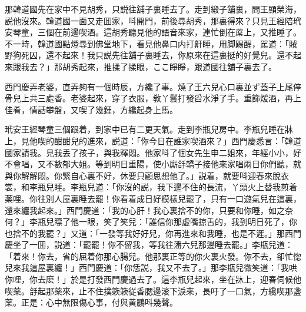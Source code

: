 那韓道國先在家中不見胡秀，只説往舖子裏睡去了。走到緞子舖裏，問王顯榮海，説他沒來。韓道國一面又走囬家，呌開門，前後尋胡秀，那裏得來？只見王經陪玳安琴童，三個在前邊喫酒。這胡秀聽見他的語音來家，連忙倒在蓆上，又推睡了。不一時，韓道國點燈尋到佛堂地下，看見他鼻口内打鼾睡，用脚踢醒，駡道：「賊野狗死囚，還不起來！我只説先往舖子裏睡去，你原來在這裏挺的好覺兒。還不起來跟我去？」那胡秀起來，推揉了揉眼，ここ睜睜，跟道國往舖子裏去了。

西門慶弄老婆，直弄夠有一個時辰，方纔了事。燒了王六兒心口裏並ず蓋子上尾停骨兒上共三處香。老婆起來，穿了衣服，敎丫鬟打發舀水淨了手。重篩煖酒，再上佳肴，情話攀盤，又喫了幾鍾，方纔起身上馬。

玳安王經琴童三個跟着，到家中已有二更天氣。走到李瓶兒房中。李瓶兒睡在牀上，見他喫的酣酣兒的進來，説道：「你今日在誰家喫酒來？」西門慶悉言：「韓道國家請我。見我丢了孩子，與我釋悶。他家呌了個女先生申二姐來，年經小小，好不會唱，又不數郁大姐。等到明日重陽，使小廝㧱轎子接他來家唱兩日你們聽，就與你解解悶。你緊自心裏不好，休要只顧思想他了。」説着，就要呌迎春來脫衣裳，和李瓶兒睡。李瓶兒道：「你沒的説，我下邊不住的長流，丫頭火上替我煎着薬哩。你往別人屋裏睡去罷！你看着成日好模樣兒罷了，只有一口遊氣兒在這裏，還來纏我起來。」西門慶道：「我的心肝！我心裏捨不的你，只要和你睡，如之奈何？」李瓶兒瞟了他一眼，笑了笑兒：「誰信你那虚嘴掠舌的，我到明日死了，你也捨不的我罷？」又道：「一發等我好好兒，你再進來和我睡，也是不遲。」那西門慶坐了一囬，説道：「罷罷！你不留我，等我往潘六兒那邊睡去罷。」李瓶兒道：「着來！你去，省的屈着你那心腸兒。他那裏正等的你火裏火發。你不去，卻忙惚兒來我這屋裏纏！」西門慶道：「你恁説，我又不去了。」那李瓶兒微笑道：「我哄你哩，你去麽！」於是打發西門慶過去了。這李瓶兒起來，坐在牀上，迎春伺候他喫薬。㧱起那薬來，止不住撲簌簌従香腮邊滚下淚來，長吁了一口氣，方纔喫那盞薬。正是：心中無限傷心事，付與黄鸝呌幾聲。

